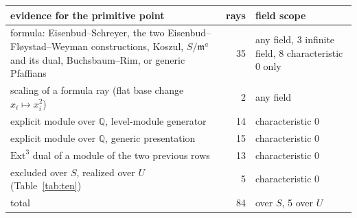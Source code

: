 \begin{tabular}{@{}>{\raggedright\arraybackslash}p{7.6cm}r>{\raggedright\arraybackslash}p{3.8cm}@{}}
\toprule
evidence for the primitive point & rays & field scope\\
\midrule
formula: Eisenbud--Schreyer, the two Eisenbud--Fl{\o}ystad--Weyman constructions, Koszul, $S/\mathfrak m^a$ and its dual, Buchsbaum--Rim, or generic Pfaffians & 35 & 24 any field, 3 infinite field, 8 characteristic 0 only\\
scaling of a formula ray (flat base change $x_i\mapsto x_i^2$) & 2 & any field\\
explicit module over $\mathbb{Q}$, level-module generator & 14 & characteristic 0\\
explicit module over $\mathbb{Q}$, generic presentation & 15 & characteristic 0\\
$\mathrm{Ext}^3$ dual of a module of the two previous rows & 13 & characteristic 0\\
excluded over $S$, realized over $U$ (Table~\ref{tab:ten}) & 5 & characteristic 0\\
total & 84 & 79 over $S$, 5 over $U$\\
\bottomrule
\end{tabular}
